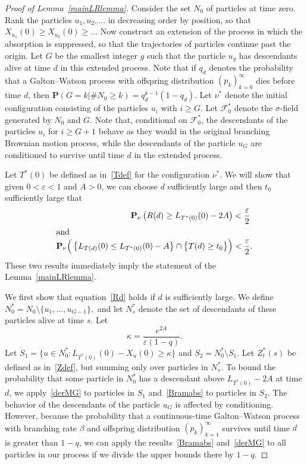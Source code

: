 \documentclass[10pt]{amsart}
\theoremstyle{definition}\newtheorem{defi}[theo]{Definition}\newtheorem{rema}[theo]{Remark}\newtheorem{exam}[theo]{Example}\newtheorem{exem}[theo]{Example}\newtheorem{nota}[theo]{Notation}
\newcommand*\eps{\varepsilon}
\renewcommand*\P{\mathbf{P}}
\newcommand\F{\mathcal{F}}
\newcommand{\1} {\mathds{1}}
\begin{document}
\begin{proof}[Proof of Lemma~\ref{mainLRlemma}]
Consider the set $N_0$ of particles at time zero. Rank the particles $u_1, u_2, \dots$ in decreasing order by position, so that $X_{u_1}(0) \geq X_{u_2}(0) \geq \dots$ Now construct an extension of the process in which the absorption is suppressed, so that the trajectories of particles continue past the origin. Let $G$ be the smallest integer $g$ such that the particle $u_g$ has descendants alive at time $d$ in this extended process. Note that if $q_d$ denotes the probability that a Galton--Watson process with offspring distribution $(p_k)_{k=0}^{\infty}$ dies before time $d$, then $\P(G = k|\#N_0 \geq k) = q_d^{k-1}(1 - q_d)$. Let $\nu^*$ denote the initial configuration consisting of the particles $u_i$ with $i \geq G$. Let $\F_0^*$ denote the $\sigma$-field generated by $N_0$ and $G$. Note that, conditional on $\F_0^*$, the descendants of the particles $u_i$ for $i \geq G+1$ behave as they would in the original branching Brownian motion process, while the descendants of the particle $u_G$ are conditioned to survive until time $d$ in the extended process.

Let $T^*(0)$ be defined as in~\eqref{Tdef} for the configuration $\nu^*$. We will show that given $0 < \eps < 1$ and $A > 0$, we can choose $d$ sufficiently large and then $t_0$ sufficiently large that
\begin{align}
\P_{\nu}\left(R(d) \geq L_{T^*(0)}(0) - 2A\right) &< \frac{\eps}{2}\label{Rd}\\
\intertext{and}
\P_{\nu}\Big(\left\{L_{T(d)}(0) \leq L_{T^*(0)}(0) - A\right\} \cap \big\{T(d) \geq t_0\big\} \Big) &< \frac{\eps}{2}.\label{needL1}
\end{align}
These two results immediately imply the statement of the Lemma~\ref{mainLRlemma}.

We first show that equation~\eqref{Rd} holds if $d$ is sufficiently large. We define $N^*_0 = N_0 \setminus \{u_1, \dots, u_{G-1}\},$ and let $N^*_s$ denote the set of descendants of these particles alive at time $s$. Let
\[
\kappa = \frac{e^{2A}}{\eps (1-q)}.
\]
Let $S_1 = \{u \in N^*_0: L_{T^*(0)}(0) - X_u(0) \geq \kappa\}$ and $S_2 = N^*_0 \setminus S_1$. Let $Z_t^*(s)$ be defined as in~\eqref{Zdef}, but summing only over particles in $N^*_s$. To bound the probability that some particle in $N_0^*$ has a descendant above $L_{T^*(0)} - 2A$ at time $d$, we apply~\eqref{derMG} to particles in $S_1$ and~\eqref{Bramabs} to particles in $S_2$. The behavior of the descendants of the particle $u_G$ is affected by conditioning. However, because the probability that a continuous-time Galton--Watson process with branching rate $\beta$ and offspring distribution $(p_k)_{k=1}^{\infty}$ survives until time $d$ is greater than $1 - q$, we can apply the results~\eqref{Bramabs} and~\eqref{derMG} to all particles in our process if we divide the upper bounds there by $1 - q$.


\end{proof}
\end{document}
